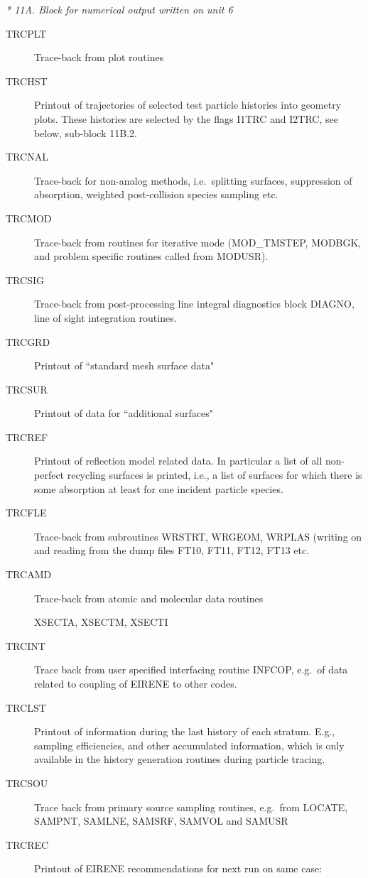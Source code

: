 \textsl{* 11A.
  Block for numerical output written on unit 6}
\begin{description}
  \item[TRCPLT]
        Trace-back from plot routines
  \item[TRCHST] Printout of trajectories of
        selected test particle histories into geometry plots.
        These histories are selected by the flags I1TRC and I2TRC, see below, sub-block
        11B.2.
  \item[TRCNAL] Trace-back for non-analog methods, i.e.\ splitting surfaces,
        suppression of absorption, weighted post-collision species sampling etc.
  \item[TRCMOD] Trace-back from routines for iterative mode (MOD\_TMSTEP, MODBGK,
        and problem specific routines called from MODUSR).
  \item[TRCSIG] Trace-back from post-processing line integral diagnostics block
        DIAGNO, line of sight integration routines.
  \item[TRCGRD] Printout of ``standard mesh surface data"
  \item[TRCSUR] Printout
        of data for ``additional surfaces"
  \item[TRCREF] Printout of reflection model
        related data.
        In particular a list of all non-perfect recycling surfaces is printed, i.e., a
        list of surfaces for which there is some absorption at least for one incident
        particle species.
  \item[TRCFLE] Trace-back from subroutines WRSTRT, WRGEOM, WRPLAS (writing on
        and reading from the dump files FT10, FT11, FT12, FT13 etc.
  \item[TRCAMD]
        Trace-back from atomic and molecular data routines

        XSECTA, XSECTM, XSECTI
  \item[TRCINT] Trace back from user specified interfacing
        routine INFCOP, e.g.\ of data related to coupling of EIRENE to other codes.
  \item[TRCLST] Printout of information during the last history of each stratum.
        E.g., sampling efficiencies, and other accumulated information, which is only
        available in the history generation routines during particle tracing.
  \item[TRCSOU] Trace back from primary source sampling routines, e.g.\ from
        LOCATE, SAMPNT, SAMLNE, SAMSRF, SAMVOL and SAMUSR
  \item[TRCREC] Printout of
        EIRENE recommendations for next run on same case:


\end{description}
